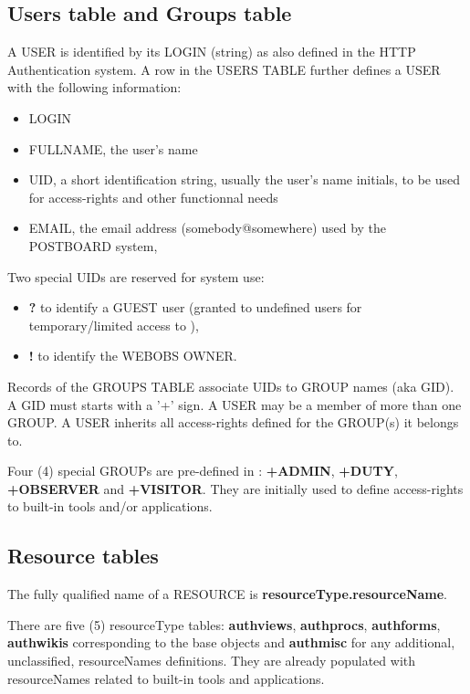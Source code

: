 \subsection{Users table and Groups table}
\label{usertable}

A \webobs USER is identified by its LOGIN (string) as also defined in the HTTP Authentication system. A row in  
the USERS TABLE further defines a USER with the following information: 

\begin{itemize}
\item   LOGIN
\item   FULLNAME, the user's name
\item   UID, a short identification string, usually the user's name initials, to be used for access-rights and other functionnal needs
\item   EMAIL, the email address (somebody@somewhere) used by the \webobs POSTBOARD system,
\end{itemize}

Two special UIDs are reserved for system use: 
\begin{itemize}
\item   \textbf{?} to identify a GUEST user (granted to undefined users for temporary/limited access to \webobs), 
\item   \textbf{!} to identify the WEBOBS OWNER.
\end{itemize}

Records of the GROUPS TABLE associate UIDs to GROUP names (aka GID). A GID must starts with a '+' sign.
A USER may be a member of more than one GROUP. A USER inherits all access-rights defined for the GROUP(s) it belongs to. 

Four (4) special GROUPs are pre-defined in \webobs: \textbf{+ADMIN}, \textbf{+DUTY}, \textbf{+OBSERVER} and \textbf{+VISITOR}. They are initially used to  
define access-rights to \webobs built-in tools and/or applications. 

\subsection{Resource tables}

The fully qualified name of a \webobs RESOURCE is \textbf{resourceType.resourceName}.

There are five (5) resourceType tables: \textbf{authviews}, \textbf{authprocs}, \textbf{authforms}, \textbf{authwikis} corresponding to the base \webobs objects 
and \textbf{authmisc} for any additional, unclassified, resourceNames definitions. They are already populated with resourceNames related to \webobs built-in tools and applications.

